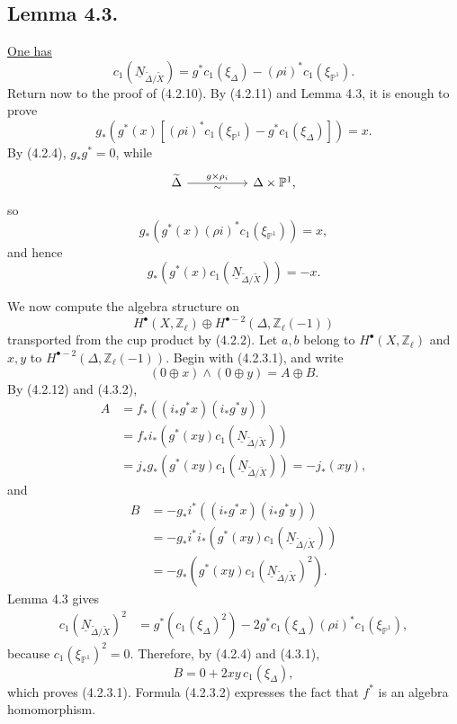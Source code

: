 \subsection*{Lemma 4.3.}
\underline{One has}
\[
c_1(\underline N_{\widetilde\Delta/\widetilde X})
=g^*c_1(\xi_\Delta)-(\rho i)^*c_1(\xi_{\mathbb P^1}).
\]
Return now to the proof of (4.2.10).  By (4.2.11) and Lemma 4.3, it is enough
to prove
\[
g_*\!\left(g^*(x)\left[(\rho i)^*c_1(\xi_{\mathbb P^1})
                       -g^*c_1(\xi_\Delta)\right]\right)=x.
\]
By (4.2.4), $g_*g^*=0$, while
\[
\begin{tikzcd}[column sep=huge]
\widetilde\Delta\arrow[r,"g\times\rho_i","\sim"']
  &\Delta\times\mathbb P^1,
\end{tikzcd}
\]
so
\begin{equation}\tag{4.3.1}
g_*\!\left(g^*(x)(\rho i)^*c_1(\xi_{\mathbb P^1})\right)=x,
\end{equation}
and hence
\begin{equation}\tag{4.3.2}
g_*\!\left(g^*(x)c_1(\underline N_{\widetilde\Delta/\widetilde X})\right)
=-x.
\end{equation}

We now compute the algebra structure on
\[
H^\bullet(X,\mathbb Z_\ell)\oplus
H^{\bullet-2}(\Delta,\mathbb Z_\ell(-1))
\]
transported from the cup product by (4.2.2).  Let $a,b$ belong to
$H^\bullet(X,\mathbb Z_\ell)$ and $x,y$ to
$H^{\bullet-2}(\Delta,\mathbb Z_\ell(-1))$.  Begin with (4.2.3.1), and write
\[
(0\oplus x)\wedge(0\oplus y)=A\oplus B.
\]
By (4.2.12) and (4.3.2),
\[
\begin{aligned}
A
&=f_*\!\left((i_*g^*x)(i_*g^*y)\right)\\
&=f_*i_*\!\left(g^*(xy)c_1(\underline N_{\widetilde\Delta/\widetilde X})\right)\\
&=j_*g_*\!\left(g^*(xy)c_1(\underline N_{\widetilde\Delta/\widetilde X})\right)
=-j_*(xy),
\end{aligned}
\]
and
\[
\begin{aligned}
B
&=-g_*i^*\!\left((i_*g^*x)(i_*g^*y)\right)\\
&=-g_*i^*i_*\!\left(g^*(xy)c_1(\underline N_{\widetilde\Delta/\widetilde X})\right)\\
&=-g_*\!\left(g^*(xy)c_1(\underline N_{\widetilde\Delta/\widetilde X})^2\right).
\end{aligned}
\]
Lemma 4.3 gives
\[
\begin{aligned}
c_1(\underline N_{\widetilde\Delta/\widetilde X})^2
&=g^*\!\left(c_1(\xi_\Delta)^2\right)
 -2g^*c_1(\xi_\Delta)(\rho i)^*c_1(\xi_{\mathbb P^1}),
\end{aligned}
\]
because $c_1(\xi_{\mathbb P^1})^2=0$.  Therefore, by (4.2.4) and (4.3.1),
\[
B=0+2xy\,c_1(\xi_\Delta),
\]
which proves (4.2.3.1).  Formula (4.2.3.2) expresses the fact that $f^*$ is
an algebra homomorphism.

